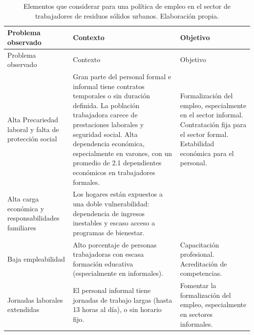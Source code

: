 \documentclass[
  spanish,
  11pt,
  a4paper,
]{scrbook}
\begin{document}
\begin{longtable}[]{@{}
  >{\raggedright\arraybackslash}p{}
  >{\raggedright\arraybackslash}p{}
  >{\raggedright\arraybackslash}p{}@{}}
\caption{Elementos que considerar para una política de empleo en el
sector de trabajadores de residuos sólidos urbanos. Elaboración
propia.}\label{tbl-3}\tabularnewline
\toprule\noalign{}
\begin{minipage}[b]{\linewidth}\raggedright
Problema observado
\end{minipage} & \begin{minipage}[b]{\linewidth}\raggedright
Contexto
\end{minipage} & \begin{minipage}[b]{\linewidth}\raggedright
Objetivo
\end{minipage} \\
\midrule\noalign{}
\endfirsthead
\toprule\noalign{}
\begin{minipage}[b]{\linewidth}\raggedright
Problema observado
\end{minipage} & \begin{minipage}[b]{\linewidth}\raggedright
Contexto
\end{minipage} & \begin{minipage}[b]{\linewidth}\raggedright
Objetivo
\end{minipage} \\
\midrule\noalign{}
\endhead
\bottomrule\noalign{}
\endlastfoot
Alta Precariedad laboral y falta de protección social & Gran parte del
personal formal e informal tiene contratos temporales o sin duración
definida. La población trabajadora carece de prestaciones laborales y
seguridad social. Alta dependencia económica, especialmente en varones,
con un promedio de 2.1 dependientes económicos en trabajadores formales.
& Formalización del empleo, especialmente en el sector informal.
Contratación fija para el sector formal. Estabilidad económica para el
personal. \\
Alta carga económica y responsabilidades familiares & Los hogares están
expuestos a una doble vulnerabilidad: dependencia de ingresos inestables
y escaso acceso a programas de bienestar. & \\
Baja empleabilidad & Alto porcentaje de personas trabajadoras con escasa
formación educativa (especialmente en informales). & Capacitación
profesional. Acreditación de competencias. \\
Jornadas laborales extendidas & El personal informal tiene jornadas de
trabajo largas (hasta 13 horas al día), o sin horario fijo. & Fomentar
la formalización del empleo, especialmente en sectores informales. \\
\end{longtable}
\end{document}
